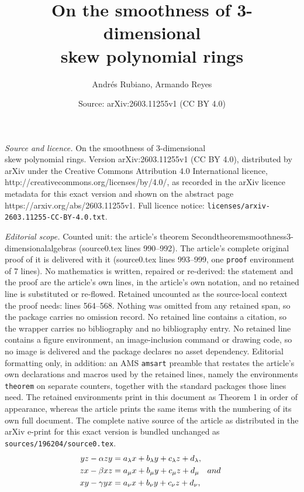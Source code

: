 \documentclass[10pt,a4paper]{amsart}
\title{On the smoothness of 3-dimensional \\ skew polynomial rings}
\author{Andr\'es Rubiano, Armando Reyes}
\date{Source: arXiv:2603.11255v1 (CC BY 4.0)}
\begin{document}
\maketitle

\noindent\emph{Source and licence.} On the smoothness of 3-dimensional \\ skew polynomial rings. Version arXiv:2603.11255v1 (CC BY 4.0), distributed by arXiv under the Creative Commons Attribution 4.0 International licence, http://creativecommons.org/licenses/by/4.0/, as recorded in the arXiv licence metadata for this exact version and shown on the abstract page https://arxiv.org/abs/2603.11255v1. Full licence notice: \texttt{licenses/arxiv-2603.11255-CC-BY-4.0.txt}.\par\smallskip

\noindent\textit{Editorial scope.} Counted unit: the article's theorem Secondtheoremsmoothness3-dimensionalalgebras (source0.tex lines 990--992). The article's complete original proof of it is delivered with it (source0.tex lines 993--999, one \texttt{proof} environment of 7 lines). No mathematics is written, repaired or re-derived: the statement and the proof are the article's own lines, in the article's own notation, and no retained line is substituted or re-flowed.  Retained uncounted as the source-local context the proof needs: lines 564--568.  Nothing was omitted from any retained span, so the package carries no omission record.  No retained line contains a citation, so the wrapper carries no bibliography and no bibliography entry.  No retained line contains a figure environment, an image-inclusion command or drawing code, so no image is delivered and the package declares no asset dependency.  Editorial formatting only, in addition: an AMS \texttt{amsart} preamble that restates the article's own declarations and macros used by the retained lines, namely the environments \texttt{theorem} on separate counters, together with the standard packages those lines need.  The retained environments print in this document as Theorem 1 in order of appearance, whereas the article prints the same items with the numbering of its own full document.  The complete native source of the article as distributed in the arXiv e-print for this exact version is bundled unchanged as \texttt{sources/196204/source0.tex}.
\begin{align}
yz-\alpha zy & = a_{\lambda}x+b_{\lambda}y+c_{\lambda}z+d_{\lambda}, \notag \\
zx-\beta xz & = a_{\mu}x+b_{\mu}y+c_{\mu}z+d_{\mu}  \quad {\rm and}\ \label{rel3skew} \\
xy-\gamma yx & = a_{\nu}x+b_{\nu}y+c_{\nu}z+d_{\nu}, \notag
\end{align} 
\end{document}
